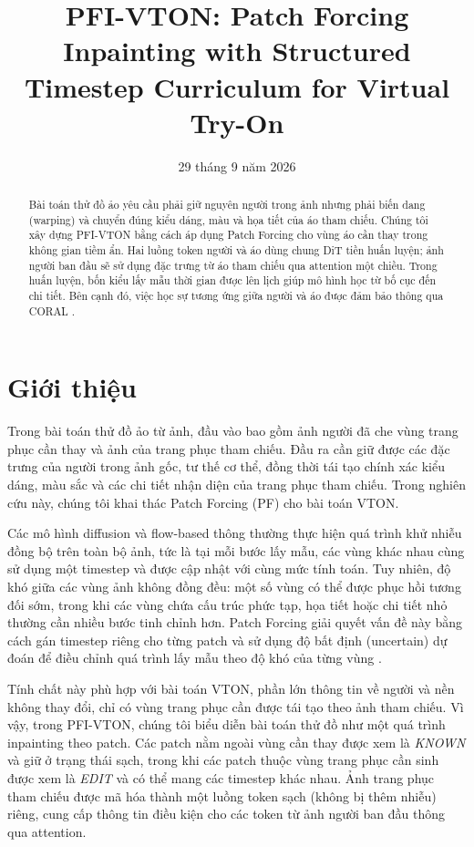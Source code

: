 \documentclass[11pt,a4paper]{article}
\title{PFI-VTON: Patch Forcing Inpainting with Structured Timestep Curriculum for Virtual Try-On}
\author{}
\date{29 tháng 9 năm 2026}
\begin{document}
\maketitle
\begin{abstract}
Bài toán thử đồ ảo yêu cầu phải giữ nguyên người trong ảnh nhưng phải biến dang (warping) và chuyển đúng kiểu dáng, màu và họa tiết của áo tham chiếu. Chúng tôi xây dựng PFI-VTON bằng cách áp dụng Patch Forcing \cite{pf} cho vùng áo cần thay trong không gian tiềm ẩn. Hai luồng token người và áo dùng chung DiT tiền huấn luyện; ảnh người ban đầu sẽ sử dụng đặc trưng từ áo tham chiếu qua attention một chiều. Trong huấn luyện, bốn kiểu lấy mẫu thời gian được lên lịch giúp mô hình học từ bố cục đến chi tiết. Bên cạnh đó, việc học sự tương ứng giữa người và áo được đảm bảo thông qua CORAL \cite{coral}. \end{abstract}

\section{Giới thiệu}
Trong bài toán thử đồ ảo từ ảnh, đầu vào bao gồm ảnh người đã che vùng trang phục cần thay và ảnh của trang phục tham chiếu. Đầu ra cần giữ được các đặc trưng của người trong ảnh gốc, tư thế cơ thể, đồng thời tái tạo chính xác kiểu dáng, màu sắc và các chi tiết nhận diện của trang phục tham chiếu. Trong nghiên cứu này, chúng tôi khai thác Patch Forcing (PF) \cite{pf} cho bài toán VTON.

Các mô hình diffusion và flow-based thông thường thực hiện quá trình khử nhiễu đồng bộ trên toàn bộ ảnh, tức là tại mỗi bước lấy mẫu, các vùng khác nhau cùng sử dụng một timestep và được cập nhật với cùng mức tính toán. Tuy nhiên, độ khó giữa các vùng ảnh không đồng đều: một số vùng có thể được phục hồi tương đối sớm, trong khi các vùng chứa cấu trúc phức tạp, họa tiết hoặc chi tiết nhỏ thường cần nhiều bước tinh chỉnh hơn. Patch Forcing giải quyết vấn đề này bằng cách gán timestep riêng cho từng patch và sử dụng độ bất định (uncertain) dự đoán để điều chỉnh quá trình lấy mẫu theo độ khó của từng vùng \cite{pf}.

Tính chất này phù hợp với bài toán VTON, phần lớn thông tin về người và nền không thay đổi, chỉ có vùng trang phục cần được tái tạo theo ảnh tham chiếu. Vì vậy, trong PFI-VTON, chúng tôi biểu diễn bài toán thử đồ như một quá trình inpainting theo patch. Các patch nằm ngoài vùng cần thay được xem là \textit{KNOWN} và giữ ở trạng thái sạch, trong khi các patch thuộc vùng trang phục cần sinh được xem là \textit{EDIT} và có thể mang các timestep khác nhau. Ảnh trang phục tham chiếu được mã hóa thành một luồng token sạch (không bị thêm nhiễu) riêng, cung cấp thông tin điều kiện cho các token từ ảnh người ban đầu thông qua attention.
\end{document}
